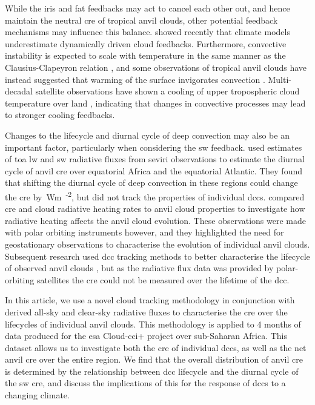 \documentclass[acp, manuscript]{copernicus}
\begin{document}
While the iris and \acrshort{fat} feedbacks may act to cancel each other out, and hence maintain the neutral \acrshort{cre} of tropical anvil clouds, other potential feedback mechanisms may influence this balance.
\citet{hill_climate_2023} showed recently that climate models underestimate dynamically driven cloud feedbacks.
Furthermore, convective instability is expected to scale with temperature in the same manner as the Clausius-Clapeyron relation \citep{seeley_why_2015, agard_clausius_2017}, and some observations of tropical anvil clouds have instead suggested that warming of the surface invigorates convection \citep{igel_cloudsat_2014}.
Multi-decadal satellite observations have shown a cooling of upper tropospheric cloud temperature over land \citep{liu_observed_2023}, indicating that changes in convective processes may lead to stronger cooling feedbacks.

Changes to the lifecycle and diurnal cycle of deep convection may also be an important factor, particularly when considering the \acrshort{sw} feedback. 
\citet{nowicki_observations_2004} used estimates of \acrfull{toa} \acrshort{lw} and \acrshort{sw} radiative fluxes from \acrfull{seviri} observations to estimate the diurnal cycle of anvil \acrshort{cre} over equatorial Africa and the equatorial Atlantic. 
They found that shifting the diurnal cycle of deep convection in these regions could change the \acrshort{cre} by \,\unit{Wm\textsuperscript{-2}}, but did not track the properties of individual \acrshort{dcc}s.
\citet{bouniol_macrophysical_2016} compared \acrshort{cre} and cloud radiative heating rates to anvil cloud properties to investigate how radiative heating affects the anvil cloud evolution.
These observations were made with polar orbiting instruments however, and they highlighted the need for geostationary observations to characterise the evolution of individual anvil clouds.
Subsequent research used \acrshort{dcc} tracking methods to better characterise the lifecycle of observed anvil clouds \citep{bouniol_life_2021}, but as the radiative flux data was provided by polar-orbiting satellites the \acrshort{cre} could not be measured over the lifetime of the \acrshort{dcc}.

In this article, we use a novel cloud tracking methodology in conjunction with derived all-sky and clear-sky radiative fluxes to characterise the \acrshort{cre} over the lifecycles of individual anvil clouds. 
This methodology is applied to 4 months of data produced for the \acrshort{esa} Cloud-\acrshort{cci}+ project over sub-Saharan Africa. 
This dataset allows us to investigate both the \acrshort{cre} of individual \acrshort{dcc}s, as well as the net anvil \acrshort{cre} over the entire region. 
We find that the overall distribution of anvil \acrshort{cre} is determined by the relationship between \acrshort{dcc} lifecycle and the diurnal cycle of the \acrshort{sw} \acrshort{cre}, and discuss the implications of this for the response of \acrshort{dcc}s to a changing climate.
\end{document}
